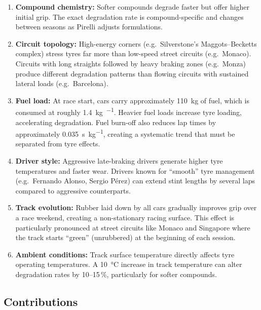 \documentclass[journal,twoside]{IEEEtran}
\begin{document}
\begin{enumerate}[noitemsep]
  \item \textbf{Compound chemistry:}  Softer compounds degrade faster
        but offer higher initial grip.  The exact degradation rate is
        compound-specific and changes between seasons as Pirelli adjusts
        formulations.
  \item \textbf{Circuit topology:}  High-energy corners (e.g.\
        Silverstone's Maggots--Becketts complex) stress tyres far more
        than low-speed street circuits (e.g.\ Monaco).  Circuits with
        long straights followed by heavy braking zones (e.g.\ Monza)
        produce different degradation patterns than flowing circuits
        with sustained lateral loads (e.g.\ Barcelona).
  \item \textbf{Fuel load:}  At race start, cars carry approximately
        \SI{110}{\kilo\gram} of fuel, which is consumed at roughly
        \SI{1.4}{\kilo\gram\per\text{lap}}.  Heavier fuel loads
        increase tyre loading, accelerating degradation.  Fuel burn-off
        also reduces lap times by approximately
        \SI{0.035}{\second\per\kilo\gram}, creating a systematic trend
        that must be separated from tyre effects.
  \item \textbf{Driver style:}  Aggressive late-braking drivers generate
        higher tyre temperatures and faster wear.  Drivers known for
        ``smooth'' tyre management (e.g.\ Fernando Alonso, Sergio
        P\'{e}rez) can extend stint lengths by several laps compared to
        aggressive counterparts.
  \item \textbf{Track evolution:}  Rubber laid down by all cars
        gradually improves grip over a race weekend, creating a
        non-stationary racing surface.  This effect is particularly
        pronounced at street circuits like Monaco and Singapore where
        the track starts ``green'' (unrubbered) at the beginning of
        each session.
  \item \textbf{Ambient conditions:}  Track surface temperature
        directly affects tyre operating temperatures.  A
        \SI{10}{\celsius} increase in track temperature can alter
        degradation rates by 10--15\,\%, particularly for softer
        compounds.
\end{enumerate}

\subsection{Contributions}
\end{document}
